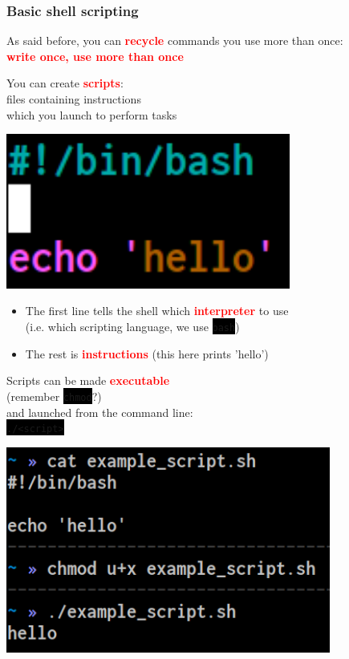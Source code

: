 \documentclass[unknownkeysallowed, 10pt, a4 paper, handout]{beamer}
\newcommand{\focus}[1]{\textbf{\textcolor{red}{#1}}}
\newcommand{\code}[1]{\colorbox{black}{\color{green}\texttt{#1}}}
\newcommand{\sidebyside}[5]{
  \begin{minipage}{#1\textwidth}
    #2
  \end{minipage} #3 \begin{minipage}{#4\textwidth}
    #5
  \end{minipage}
}
\begin{document}
\begin{frame}
  \begin{center}
    \frametitle{Basic shell scripting}

    As said before, you can \focus{recycle} commands you use more than once:\\
    \focus{write once, use more than once}

    \sidebyside{0.50}{
      You can create \focus{scripts}:\\
      files containing instructions\\
      which you launch to perform tasks
    }{\hfill}{0.45}{
      \begin{center}
        \includegraphics[width=0.70\textwidth]{pics/script_1.png}
      \end{center}
    }

    \begin{itemize}
      \item The first line tells the shell which \focus{interpreter} to use\\
        (i.e. which scripting language, we use \code{bash})
      \item The rest is \focus{instructions} (this here prints 'hello')
    \end{itemize}

    \sidebyside{0.50}{
      Scripts can be made \focus{executable}\\
      (remember \code{chmod}?)\\
      and launched from the command line:\\
      \code{./<script>}
    }{\hfill}{0.45}{
      \begin{center}
        \includegraphics[width=0.80\textwidth]{pics/script_2.png}
      \end{center}
    }
  \end{center}
\end{frame}
\end{document}
